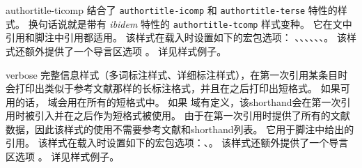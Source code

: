 \begin{marglist}
\item[authortitle-ticomp]
结合了 \texttt{authortitle-icomp} 和 \texttt{authortitle-terse} 特性的样式。
换句话说就是带有 \emph{ibidem} 特性的 \texttt{authortitle-tcomp} 样式变种。
它在文中引用和脚注中引用都适用。
该样式在载入时设置如下的宏包选项：
、、、、、、。
该样式还额外提供了一个导言区选项 。
详见样式例子。

\item[verbose]
完整信息样式（多词标注样式、详细标注样式），在第一次引用某条目时会打印出类似于参考文献那样的长标注格式，并且在之后打印出短格式。
如果可用的话， 域会用在所有的短格式中。
如果  域有定义，该shorthand会在第一次引用时被引入并在之后作为短格式被使用。
由于在第一次引用时提供了所有的文献数据，因此该样式的使用不需要参考文献和shorthand列表。
它用于脚注中给出的引用。
该样式在载入时设置如下的宏包选项：、。
该样式还额外提供了一个导言区选项 。
详见样式例子。


\end{marglist}
